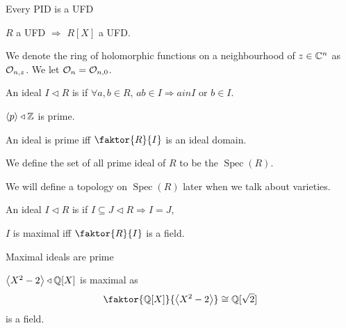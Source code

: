 \documentclass{article}
\begin{document}
\begin{prop}
	Every PID is a UFD
\end{prop}

\begin{prop}$R$ a UFD $\Rightarrow$ $R[X]$ a UFD. 
\end{prop}

\begin{notation}
	We denote the ring of holomorphic functions on a neighbourhood of $z \in \mathbb{C}^n$ as $\mathcal{O}_{n,z}$. We let $\mathcal{O}_n = \mathcal{O}_{n,0}$.
\end{notation}


\begin{definition}
	An ideal $I \triangleleft R$ is  if $\forall a,b \in R, \, ab \in I \Rightarrow a in I$ or $b \in I$. 
\end{definition}

\begin{example}
	$\left\langle p \right\rangle \triangleleft \mathbb{Z}$ is prime. 
\end{example}

\begin{prop}
	An ideal is prime iff $\faktor{R}{I}$ is an ideal domain. 
\end{prop}

\begin{definition}
	We define the set of all prime ideal of $R$ to be the  $\operatorname{Spec}(R)$. 
\end{definition}

\begin{remark}
	We will define a topology on $\operatorname{Spec}(R)$ later when we talk about varieties. 
\end{remark}

\begin{definition}
	An ideal $I \triangleleft R$ is  if $I \subseteq J \triangleleft R \Rightarrow I=J$, 
\end{definition}

\begin{prop}
	$I$ is maximal iff $\faktor{R}{I}$ is a field. 
\end{prop}

\begin{prop}
	Maximal ideals are prime
\end{prop}

\begin{example}
	$\left\langle X^2-2 \right\rangle \triangleleft \mathbb{Q}[X]$ is maximal as 
	\[
	\faktor{\mathbb{Q}[X]}{\pangle{X^2-2}} \cong \mathbb{Q}[\sqrt{2}] 
	\]
	is a field. 
\end{example}
\end{document}
